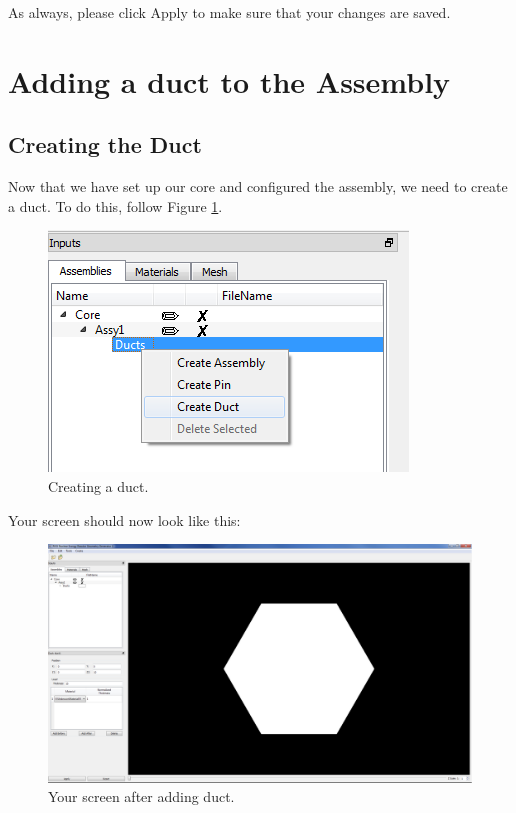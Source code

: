 As always, please click Apply to make sure that your changes are saved.

\section{Adding a duct to the Assembly}

\subsection{Creating the Duct}

Now that we have set up our core and configured the assembly, we need to create a duct.  To do this, follow Figure \ref{fig:Hex5}.

\begin{figure}[H]
	\begin{center}
		\includegraphics[width=0.5\linewidth]{Images/hex-5.png}
		\caption{Creating a duct.}
		\label{fig:Hex5}
	\end{center}
\end{figure}

Your screen should now look like this:

\begin{figure}[H]
	\begin{center}
		\includegraphics[width=0.85\linewidth]{Images/hex-6.png}
		\caption{Your screen after adding duct.}
		\label{fig:Hex6}
	\end{center}
\end{figure}

